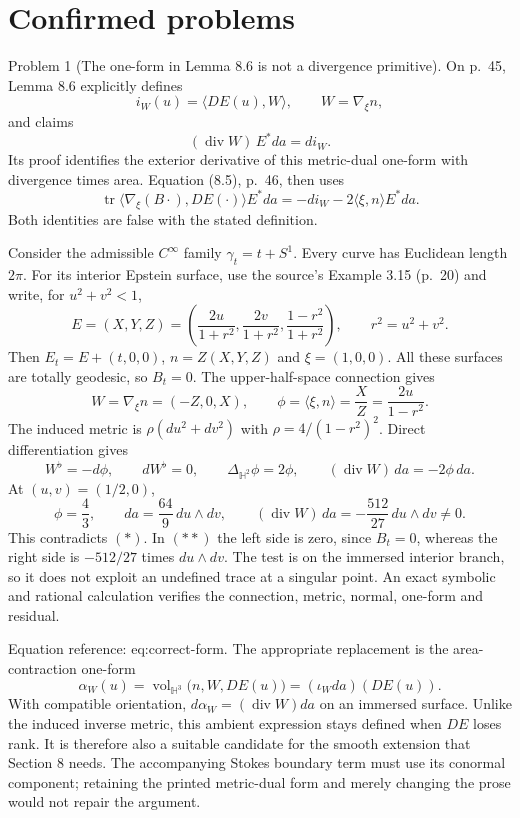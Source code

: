 \documentclass[10pt]{article}
\begin{document}
\section*{Confirmed problems}
Problem 1 (The one-form in Lemma 8.6 is not a divergence primitive).  On p. 45, Lemma 8.6 explicitly defines \[i_W(u)=\langle DE(u),W\rangle,\qquad W=\nabla_\xi n,\] and claims \[(\operatorname{div}W)\,E^*da=d i_W .
 \tag{*}\] Its proof identifies the exterior derivative of this metric-dual one-form with divergence times area. Equation (8.5), p. 46, then uses \[\operatorname{tr}\langle\nabla_\xi(B\cdot),DE(\cdot)\rangle E^*da
 =-d i_W-2\langle\xi,n\rangle E^*da .
 \tag{**}\] Both identities are false with the stated definition.\par
Consider the admissible \(C^\infty\) family \(\gamma_t=t+S^1\). Every curve has Euclidean length \(2\pi\). For its interior Epstein surface, use the source’s Example 3.15 (p. 20) and write, for \(u^2+v^2<1\), \[E=(X,Y,Z)=
 \left(\frac{2u}{1+r^2},\frac{2v}{1+r^2},
       \frac{1-r^2}{1+r^2}\right),\qquad r^2=u^2+v^2 .\] Then \(E_t=E+(t,0,0)\), \(n=Z(X,Y,Z)\) and \(\xi=(1,0,0)\). All these surfaces are totally geodesic, so \(B_t=0\). The upper-half-space connection gives \[W=\nabla_\xi n=(-Z,0,X),\qquad
 \phi=\langle\xi,n\rangle=\frac{X}{Z}=\frac{2u}{1-r^2}.\] The induced metric is \(\rho(du^2+dv^2)\) with \(\rho=4/(1-r^2)^2\). Direct differentiation gives \[W^\flat=-d\phi,\qquad dW^\flat=0,\qquad
 \Delta_{\mathbb H^2}\phi=2\phi,\qquad
 (\operatorname{div}W)\,da=-2\phi\,da .\] At \((u,v)=(1/2,0)\), \[\phi=\frac43,\qquad da=\frac{64}{9}\,du\wedge dv,\qquad
 (\operatorname{div}W)\,da=-\frac{512}{27}\,du\wedge dv\ne0.\] This contradicts \((*)\). In \((**)\) the left side is zero, since \(B_t=0\), whereas the right side is \(-512/27\) times \(du\wedge dv\). The test is on the immersed interior branch, so it does not exploit an undefined trace at a singular point. An exact symbolic and rational calculation verifies the connection, metric, normal, one-form and residual.\par
Equation reference: eq:correct-form. The appropriate replacement is the area-contraction one-form \[\alpha_W(u)=\operatorname{vol}_{\mathbb H^3}\bigl(n,W,DE(u)\bigr)
            =(\iota_W da)(DE(u)).
 \] With compatible orientation, \(d\alpha_W=(\operatorname{div}W)da\) on an immersed surface. Unlike the induced inverse metric, this ambient expression stays defined when \(DE\) loses rank. It is therefore also a suitable candidate for the smooth extension that Section 8 needs. The accompanying Stokes boundary term must use its conormal component; retaining the printed metric-dual form and merely changing the prose would not repair the argument.\par
\end{document}
